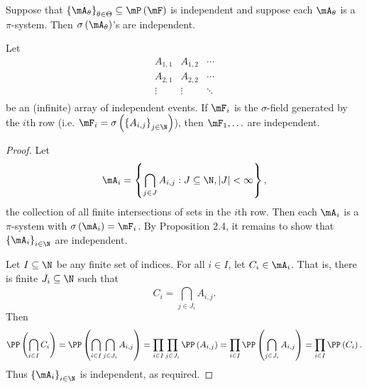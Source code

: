 \documentclass[stat901]{subfiles}
\begin{document}
    \begin{prop}{}
        Suppose that $\left\lbrace \mA_{\theta} \right\rbrace^{}_{\theta\in\Theta}\subseteq\mP\left( \mF \right)$ is independent and suppose each $\mA_{\theta}$ is a $\pi$-system. Then $\sigma\left( \mA_{\theta} \right)$'s are independent.
    \end{prop}

    \rruleline
    
    \begin{prop}{}
        Let
        \begin{equation*}
            \begin{matrix}
                A_{1,1} & A_{1,2} & \cdots \\
            	A_{2,1} & A_{2,2} & \cdots \\
            	\vdots & \vdots & \ddots \\
            \end{matrix}
        \end{equation*}
        be an (infinite) array of independent events. If $\mF_i$ is the $\sigma$-field generated by the $i$th row (i.e. $\mF_i = \sigma\left( \left\lbrace A_{i,j} \right\rbrace_{j\in\N} \right)$), then $\mF_1,\ldots$ are independent.
    \end{prop}

    \begin{proof}
        Let
        \begin{equation*}
            \mA_i = \left\lbrace \bigcap^{}_{j\in J}A_{i,j} : J\subseteq\N, \left| J \right|<\infty \right\rbrace,
        \end{equation*}
        the collection of all finite intersections of sets in the $i$th row. Then each $\mA_i$ is a $\pi$-system with $\sigma\left( \mA_i \right) = \mF_i$. By Proposition 2.4, it remains to show that $\left\lbrace \mA_i \right\rbrace^{}_{i\in\N}$ are independent.

        Let $I\subseteq\N$ be any finite set of indices. For all $i\in I$, let $C_i\in\mA_i$. That is, there is finite $J_i\subseteq\N$ such that
        \begin{equation*}
            C_i = \bigcap^{}_{j\in J_i} A_{i,j}.
        \end{equation*}
        Then
        \begin{equation*}
            \PP\left( \bigcap^{}_{i\in I}C_i \right) = \PP\left( \bigcap^{}_{i\in I} \bigcap^{}_{j\in J_i}A_{i,j} \right) = \prod^{}_{i\in I} \prod^{}_{j\in J_i} \PP\left( A_{i,j} \right) = \prod^{}_{i\in I} \PP\left( \bigcap^{}_{j\in J_i}A_{i,j} \right) = \prod^{}_{i\in I}\PP\left( C_i \right).
        \end{equation*}
        Thus $\left\lbrace \mA_i \right\rbrace^{}_{i\in\N}$ is independent, as required.
    \end{proof}
    
\end{document}
